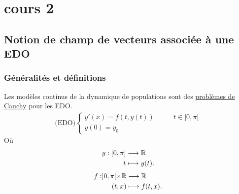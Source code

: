 
\chapter{cours 2}
\section{Notion de champ de vecteurs associée à une EDO}
\subsection{Généralités et définitions}
Les modèles continus de la dynamique de populations sont des \underline{problèmes de Cauchy} pour les EDO.
\begin{align*}
    \text{(EDO)} \begin{cases}
        y'(x) = f(t, y(t)) &\qquad t \in ]0, \pi[ \\
        y(0) = y_0  
    \end{cases}
\end{align*}
Où \begin{align*}
    y: [0, \pi] &\longrightarrow \mathbb{R} \\
    t &\longmapsto y(t) 
.\end{align*}
\begin{align*}
    f: ]0, \pi[ \times \mathbb{R} &\longrightarrow\mathbb{R}\\
    (t, x) &\longmapsto f(t, x) 
.\end{align*}

